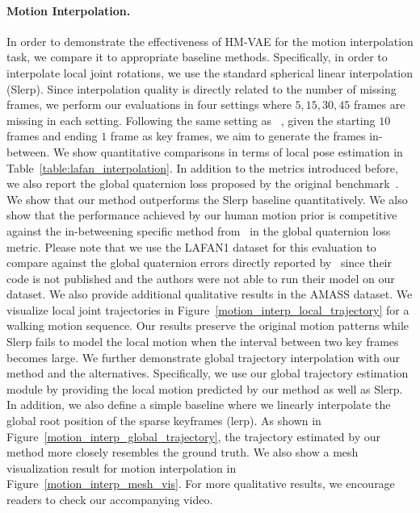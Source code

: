 \paragraph{Motion Interpolation.}
In order to demonstrate the effectiveness of HM-VAE for the motion interpolation task, we compare it to appropriate baseline methods. Specifically, in order to interpolate local joint rotations, we use the standard spherical linear interpolation (Slerp). Since interpolation quality is directly related to the number of missing frames, we perform our evaluations in four settings where $5, 15, 30, 45$ frames are missing in each setting. Following the same setting as ~\cite{harvey2020robust}, given the starting $10$ frames and ending $1$ frame as key frames, we aim to generate the frames in-between. We show quantitative comparisons in terms of local pose estimation in Table~\ref{table:lafan_interpolation}. In addition to the metrics introduced before, we also report the global quaternion loss proposed by the original benchmark~\cite{harvey2020robust}. We show that our method outperforms the Slerp baseline quantitatively.
We also show that the performance achieved by our human motion prior is competitive against the in-betweening specific method from~\cite{harvey2020robust} in the global quaternion loss metric.
Please note that we use the LAFAN1 dataset for this evaluation to compare against the global quaternion errors directly reported by~\cite{harvey2020robust} since their code is not published and the authors were not able to run their model on our dataset.  
We also provide additional qualitative results in the AMASS dataset. We visualize local joint trajectories in Figure~\ref{motion_interp_local_trajectory} for a walking motion sequence.
Our results preserve the original motion patterns while Slerp fails to model the local motion when the interval between two key frames becomes large.
We further demonstrate global trajectory interpolation with our method and the alternatives.
Specifically, we use our global trajectory estimation module by providing the local motion predicted by our method as well as Slerp. In addition, we also define a simple baseline where we linearly interpolate the global root position of the sparse keyframes (lerp).  As shown in Figure~\ref{motion_interp_global_trajectory}, the trajectory estimated by our method more closely resembles the ground truth.      
We also show a mesh visualization result for motion interpolation in Figure~\ref{motion_interp_mesh_vis}. For more qualitative results, we encourage readers to check our accompanying video.   






